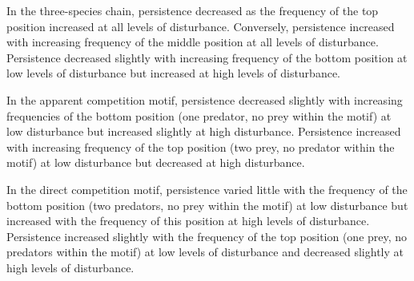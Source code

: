 \documentclass[12pt]{article}
\begin{document}
\begin{spacing}{2.0}
        
        In the three-species chain, persistence decreased as the frequency of the top position increased at all levels of disturbance.
        Conversely, persistence increased with increasing frequency of the middle position at all levels of disturbance.
        Persistence decreased slightly with increasing frequency of the bottom position at low levels of disturbance but increased at high levels of disturbance.
        
        
        In the apparent competition motif, persistence decreased slightly with increasing frequencies of the bottom position (one predator, no prey within the motif) at low disturbance but increased slightly at high disturbance.
        Persistence increased with increasing frequency of the top position (two prey, no predator within the motif) at low disturbance but decreased at high disturbance.
        
        
        In the direct competition motif, persistence varied little with the frequency of the bottom position (two predators, no prey within the motif) at low disturbance but increased with the frequency of this position at high levels of disturbance.
        Persistence increased slightly with the frequency of the top position (one prey, no predators within the motif) at low levels of disturbance and decreased slightly at high levels of disturbance.
        

\end{spacing}
\end{document}
